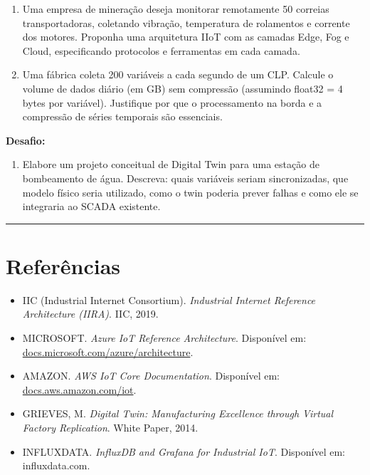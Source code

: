 \begin{enumerate}
\def\labelenumi{\arabic{enumi}.}
\setcounter{enumi}{3}
\tightlist
\item
  Uma empresa de mineração deseja monitorar remotamente 50 correias transportadoras, coletando vibração, temperatura de rolamentos e corrente dos motores. Proponha uma arquitetura IIoT com as camadas Edge, Fog e Cloud, especificando protocolos e ferramentas em cada camada.
\item
  Uma fábrica coleta 200 variáveis a cada segundo de um CLP. Calcule o volume de dados diário (em GB) sem compressão (assumindo float32 = 4 bytes por variável). Justifique por que o processamento na borda e a compressão de séries temporais são essenciais.
\end{enumerate}

\textbf{Desafio:}

\begin{enumerate}
\def\labelenumi{\arabic{enumi}.}
\setcounter{enumi}{5}
\tightlist
\item
  Elabore um projeto conceitual de Digital Twin para uma estação de bombeamento de água. Descreva: quais variáveis seriam sincronizadas, que modelo físico seria utilizado, como o twin poderia prever falhas e como ele se integraria ao SCADA existente.
\end{enumerate}

\begin{center}\rule{0.5\linewidth}{0.5pt}\end{center}

\section{Referências}\label{referuxeancias}

\begin{itemize}
\tightlist
\item
  IIC (Industrial Internet Consortium). \emph{Industrial Internet Reference Architecture (IIRA)}. IIC, 2019.
\item
  MICROSOFT. \emph{Azure IoT Reference Architecture}. Disponível em: \url{docs.microsoft.com/azure/architecture}.
\item
  AMAZON. \emph{AWS IoT Core Documentation}. Disponível em: \url{docs.aws.amazon.com/iot}.
\item
  GRIEVES, M. \emph{Digital Twin: Manufacturing Excellence through Virtual Factory Replication}. White Paper, 2014.
\item
  INFLUXDATA. \emph{InfluxDB and Grafana for Industrial IoT}. Disponível em: influxdata.com.
\end{itemize}
